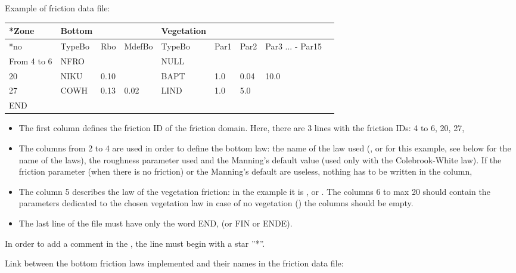 Example of friction data file:



\begin{tabular}{|p{0.4in}|p{0.5in}|p{0.3in}|p{0.5in}|p{0.6in}|p{0.5in}|p{0.5in}|p{0.6in}|p{0.6in}|} \hline
*Zone & Bottom &  &  & Vegetation &  &  &   \\ \hline
*no & TypeBo & Rbo & MdefBo & TypeBo & Par1 & Par2 & Par3 ... - Par15  \\ \hline
From 4 to 6 & NFRO &  &  & NULL & &  &   \\ \hline
20 & NIKU & 0.10 &  & BAPT & 1.0 & 0.04 & 10.0  \\ \hline
27 & COWH & 0.13 & 0.02 & LIND & 1.0 &  5.0 & \\ \hline
END &  &  &  &  &  &  &   \\ \hline
\end{tabular}


\begin{itemize}
\item The first column defines the friction ID of the friction domain.
Here, there are 3 lines with the friction IDs: 4 to 6, 20, 27,

\item The columns from 2 to 4 are used in order to define the bottom law:
the name of the law used (,  or  for this
example, see below for the name of the laws),
the roughness parameter used and the Manning's default value
(used only with the Colebrook-White law).
If the friction parameter (when there is no friction) or the Manning's default
are useless, nothing has to be written in the column,

\item The column 5 describes the law of the vegetation friction:
in the example it is ,  or . 
The columns 
6 to max 20 should contain the parameters dedicated to the chosen vegetation 
law in case of no vegetation () the columns should be empty. 


\item The last line of the file must have only the word END, (or FIN or ENDE).
\end{itemize}

In order to add a comment in the ,
the line must begin with a star ''*''.

Link between the bottom friction laws implemented and their names in the friction data file:

